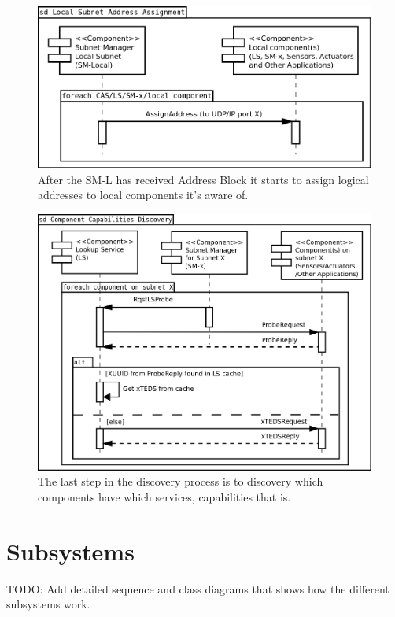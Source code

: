 \begin{figure}[h]
    \centering
    \includegraphics[width=\textwidth]{figures/vn_local_subnet_address_assignment}
    \caption{After the SM-L has received Address Block it starts to assign
    logical addresses to local components it's aware of.}
    \label{fig:appendix_vn_local_subnet_address_assignment}
\end{figure}

\begin{figure}[h]
    \centering
    \includegraphics[width=\textwidth]{figures/vn_component_capabilities_discovery}
    \caption{The last step in the discovery process is to discovery which
    components have which services, capabilities that is.}
    \label{fig:appendix_vn_component_capabilities_discovery}
\end{figure}

\section{Subsystems}
TODO: Add detailed sequence and class diagrams that shows how the different
subsystems work.
